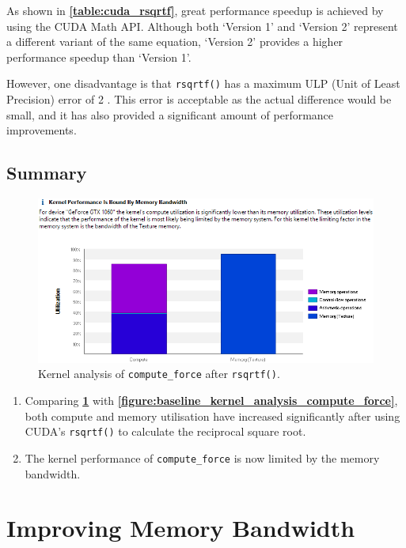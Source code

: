 \documentclass[12pt, a4paper]{article}
\let\oldcref\cref
\renewcommand{\cref}[1]{\textbf{\oldcref{#1}}}
\begin{document}
As shown in \cref{table:cuda_rsqrtf}, great performance speedup is achieved by using the CUDA Math
API. Although both `Version 1' and `Version 2' represent a different variant of the same equation,
`Version 2' provides a higher performance speedup than `Version 1'.

However, one disadvantage is that \texttt{rsqrtf()} has a maximum ULP (Unit of Least Precision)
error of 2 \cite{math_standard_func}. This error is acceptable as the actual difference would be
small, and it has also provided a significant amount of performance improvements.

\subsection{Summary}
\begin{figure}[H]
  \centering
  \includegraphics[width=\textwidth]{images/rsqrtf_kernel_analysis_compute_force.png}
  \caption{Kernel analysis of \texttt{compute\_force} after \texttt{rsqrtf()}.}
  \label{figure:rsqrtf_kernel_analysis_compute_force}
\end{figure}

\begin{enumerate}
  \item Comparing \cref{figure:rsqrtf_kernel_analysis_compute_force} with
  \cref{figure:baseline_kernel_analysis_compute_force}, both compute and memory utilisation have
  increased significantly after using CUDA's \texttt{rsqrtf()} to calculate the reciprocal square
  root.
  \item The kernel performance of \texttt{compute\_force} is now limited by the memory bandwidth.
\end{enumerate}

\pagebreak
\section{Improving Memory Bandwidth}
\end{document}
